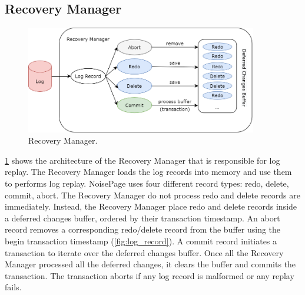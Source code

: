 \documentclass[12pt]{cmuthesis}
\begin{document}
\subsection{Recovery Manager}
\begin{figure}[t!]
\centering
\includegraphics[width=0.9\textwidth]{images/RecoveryManager.png}
\caption{Recovery Manager.}
\label{fig:recovery_manager}
\end{figure}

\cref{fig:recovery_manager} shows the architecture of the Recovery Manager that is responsible for log replay. The Recovery Manager loads the log records into memory and use them to performs log replay. NoisePage uses four different record types: redo, delete, commit, abort. The Recovery Manager do not process redo and delete records are immediately. Instead, the Recovery Manager place redo and delete records inside a deferred changes buffer, ordered by their transaction timestamp. An abort record removes a corresponding redo/delete record from the buffer using the begin transaction timestamp (\cref{fig:log_record}). A commit record initiates a transaction to iterate over the deferred changes buffer. Once all the Recovery Manager processed all the deferred changes, it clears the buffer and commits the transaction. The transaction aborts if any log record is malformed or any replay fails.
\end{document}
